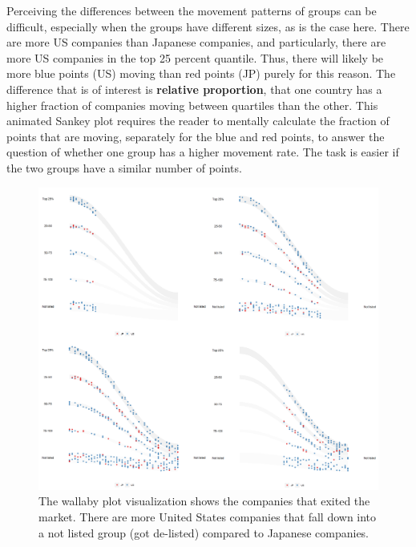 Perceiving the differences between the movement patterns of groups can be difficult, especially when the groups have different sizes, as is the case here. There are more US companies than Japanese companies, and particularly, there are more US companies in the top 25 percent quantile. Thus, there will likely be more blue points (US) moving than red points (JP) purely for this reason. The difference that is of interest is \textbf{relative proportion}, that one country has a higher fraction of companies moving between quartiles than the other. This animated Sankey plot requires the reader to mentally calculate the fraction of points that are moving, separately for the blue and red points, to answer the question of whether one group has a higher movement rate. The task is easier if the two groups have a similar number of points.

\begin{figure}

{\centering \includegraphics[width=1\linewidth]{figures/animation-exit} 

}

\caption{The wallaby plot visualization shows the companies that exited the market. There are more United States companies that fall down into a not listed group (got de-listed) compared to Japanese companies.}\label{fig:osiris-figure}
\end{figure}

